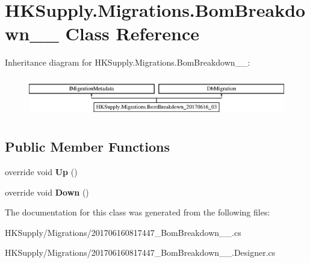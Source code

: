\hypertarget{class_h_k_supply_1_1_migrations_1_1_bom_breakdown__20170616__03}{}\section{H\+K\+Supply.\+Migrations.\+Bom\+Breakdown\+\_\+\_ Class Reference}
\label{class_h_k_supply_1_1_migrations_1_1_bom_breakdown__20170616__03}
Inheritance diagram for H\+K\+Supply.\+Migrations.\+Bom\+Breakdown\+\_\+\_\+:\begin{figure}[H]
\begin{center}
\leavevmode
\includegraphics[height=1.783440cm]{class_h_k_supply_1_1_migrations_1_1_bom_breakdown__20170616__03}
\end{center}
\end{figure}
\subsection*{Public Member Functions}
\begin{DoxyCompactItemize}
\item 
\mbox{\label{class_h_k_supply_1_1_migrations_1_1_bom_breakdown__20170616__03_aeced6dcd200ee67e9d993c0aca77b6d3}} 
override void {\bfseries Up} ()
\item 
\mbox{\label{class_h_k_supply_1_1_migrations_1_1_bom_breakdown__20170616__03_ae47dce29777e1660aca24eb2ad8ef3ae}} 
override void {\bfseries Down} ()
\end{DoxyCompactItemize}


The documentation for this class was generated from the following files\+:\begin{DoxyCompactItemize}
\item 
H\+K\+Supply/\+Migrations/201706160817447\+\_\+\+Bom\+Breakdown\+\_\+\_.\+cs\item 
H\+K\+Supply/\+Migrations/201706160817447\+\_\+\+Bom\+Breakdown\+\_\+\_.\+Designer.\+cs\end{DoxyCompactItemize}
